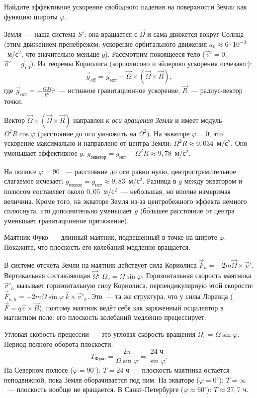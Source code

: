 \documentclass[../main.tex]{subfiles}
\begin{document}
\begin{example}
Найдите эффективное ускорение свободного падения на поверхности
Земли как функцию широты $\varphi$.

Земля~--- наша система $S'$; она вращается с $\vec{\Omega}$
и сама движется вокруг Солнца (этим движением пренебрежём:
ускорение орбитального движения $a_0 \approx 6\cdot10^{-3}$~м/с$^2$,
что значительно меньше $g$).
Рассмотрим покоящееся тело ($\vec{v}' = 0$, $\vec{a}' = \vec{g}_{\text{eff}}$).
Из теоремы Кориолиса (кориолисово и эйлерово ускорения исчезают):
\[
    \vec{g}_{\text{eff}} = \vec{g}_{\text{ист}} - \vec{\Omega}\times(\vec{\Omega}\times\vec{R}),
\]
где $\vec{g}_{\text{ист}} = -\frac{GM}{R^2}\hat{r}$~--- истинное
гравитационное ускорение, $\vec{R}$~--- радиус-вектор точки.

Вектор $\vec{\Omega}\times(\vec{\Omega}\times\vec{R})$ направлен
\textit{к оси вращения Земли} и имеет модуль $\Omega^2 R\cos\varphi$
(расстояние до оси умножить на $\Omega^2$).
На экваторе $\varphi = 0$, это ускорение максимально и направлено
от центра Земли: $\Omega^2 R \approx 0{,}034$~м/с$^2$.
Оно уменьшает эффективное $g$:
$g_{\text{экватор}} = g_{\text{ист}} - \Omega^2 R \approx 9{,}78$~м/с$^2$.

На полюсе $\varphi = 90^\circ$~--- расстояние до оси равно нулю,
центростремительное слагаемое исчезает:
$g_{\text{полюс}} = g_{\text{ист}} \approx 9{,}83$~м/с$^2$.
Разница в $g$ между экватором и полюсом составляет около $0{,}05$~м/с$^2$~---
небольшая, но вполне измеримая величина.
Кроме того, на экваторе Земля из-за центробежного эффекта немного
сплюснута, что дополнительно уменьшает $g$ (бо́льшее расстояние
от центра уменьшает гравитационное притяжение).
\end{example}

\begin{example}
Маятник Фуко~--- длинный маятник, подвешенный в точке на широте $\varphi$.
Покажите, что плоскость его колебаний медленно вращается.

В системе отсчёта Земли на маятник действует сила Кориолиса
$\vec{F}_\kappa = -2m\vec{\Omega}\times\vec{v}'$.
Вертикальная составляющая $\vec{\Omega}$: $\Omega_v = \Omega\sin\varphi$.
Горизонтальная скорость маятника $\vec{v}'_h$ вызывает горизонтальную
силу Кориолиса, перпендикулярную этой скорости:
$\vec{F}_{\kappa,h} = -2m\Omega\sin\varphi\;\hat{k}\times\vec{v}'_h$.
Это~--- та же структура, что у силы Лоренца ($\vec{F} = q\vec{v}\times\vec{B}$),
поэтому маятник ведёт себя как заряженный осциллятор в магнитном поле:
его плоскость колебаний медленно прецессирует.

Угловая скорость прецессии~--- это угловая скорость вращения
$\Omega_v = \Omega\sin\varphi$. Период полного оборота плоскости:
\[
    T_{\text{Фуко}} = \frac{2\pi}{\Omega\sin\varphi} = \frac{24\text{ ч}}{\sin\varphi}.
\]
На Северном полюсе ($\varphi = 90^\circ$): $T = 24$ ч~--- плоскость маятника
остаётся неподвижной, пока Земля оборачивается под ним.
На экваторе ($\varphi = 0^\circ$): $T = \infty$~--- плоскость вообще не вращается.
В Санкт-Петербурге ($\varphi \approx 60^\circ$): $T \approx 27{,}7$ ч.
\end{example}
\end{document}
